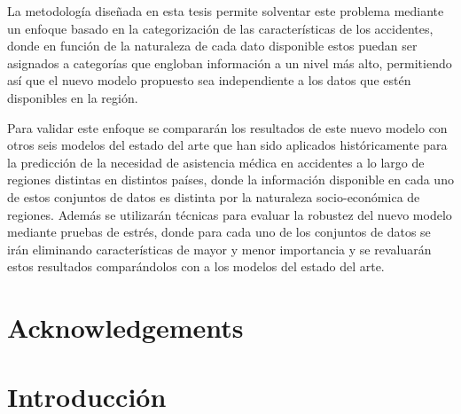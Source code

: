 \documentclass{uathesis-es}
\begin{document}
La metodología diseñada en esta tesis permite solventar este problema mediante un enfoque basado en la categorización de las características de los accidentes, donde en función de la naturaleza de cada dato disponible estos puedan ser asignados a categorías que engloban información a un nivel más alto, permitiendo así que el nuevo modelo propuesto sea independiente a los datos que estén disponibles en la región.


Para validar este enfoque se compararán los resultados de este nuevo modelo con otros seis modelos del estado del arte que han sido aplicados históricamente para la predicción de la necesidad de asistencia médica en accidentes a lo largo de regiones distintas en distintos países, donde la información disponible en cada uno de estos conjuntos de datos es distinta por la naturaleza socio-económica de regiones. Además se utilizarán técnicas para evaluar la robustez del nuevo modelo mediante pruebas de estrés, donde para cada uno de los conjuntos de datos se irán eliminando características de mayor y menor importancia y se revaluarán estos resultados comparándolos con a los modelos del estado del arte.

\chapter*{Acknowledgements}
\addtocounter{chapter}{0}




\chapter{Introducción}


\end{document}
